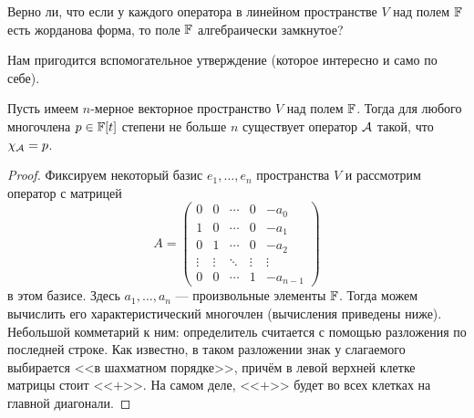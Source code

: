 \begin{problem}[А.\,А. Клячко]
    Верно ли, что если у каждого оператора в линейном пространстве $V$ над полем $\mathbb{F}$ есть жорданова форма, то поле $\mathbb{F}$ алгебраически замкнутое?
\end{problem}

Нам пригодится вспомогательное утверждение (которое интересно и само по себе).

\begin{lemma}
    Пусть имеем $n$-мерное векторное пространство $V$ над полем $\mathbb{F}$. Тогда для любого многочлена $p \in \mathbb{F}[t]$ степени не больше $n$ существует оператор $\mathcal{A}$ такой, что $\chi_{\mathcal{A}} = p$.
\end{lemma}

\begin{proof}
    Фиксируем некоторый базис $e_1, \ldots, e_n$ пространства $V$ и рассмотрим оператор с матрицей
    \[
        A = \begin{pmatrix}
            0 & 0 & \cdots & 0 & -a_0\\
            1 & 0 & \cdots & 0 & -a_1\\
            0 & 1 & \cdots & 0 & -a_2\\
            \vdots & \vdots & \ddots & \vdots & \vdots\\
            0 & 0 & \cdots & 1 & -a_{n - 1}
        \end{pmatrix}
    \]
    в этом базисе. Здесь $a_1, \ldots, a_n$ --- произвольные элементы $\mathbb{F}$. Тогда можем вычислить его характеристический многочлен (вычисления приведены ниже). Небольшой комметарий к ним: определитель считается с помощью разложения по последней строке. Как известно, в таком разложении знак у слагаемого выбирается <<в шахматном порядке>>, причём в левой верхней клетке матрицы стоит <<$+$>>. На самом деле, <<$+$>> будет во всех клетках на главной диагонали.


\end{proof}
